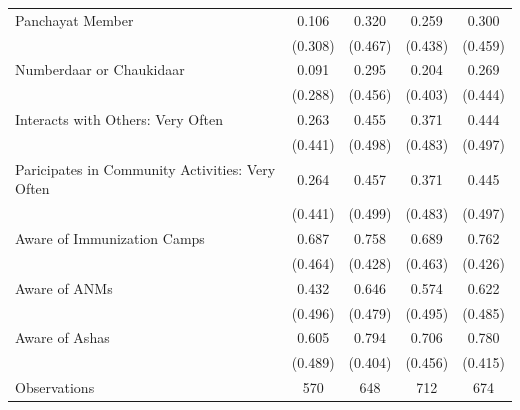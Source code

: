 \begin{tabular}{lcccc}
 Panchayat Member & 0.106 & 0.320 & 0.259  & 0.300 \\ 
  & (0.308) & (0.467) & (0.438)  & (0.459) \\ 
 Numberdaar or Chaukidaar & 0.091 & 0.295 & 0.204  & 0.269 \\ 
  & (0.288) & (0.456) & (0.403)  & (0.444) \\ 
 Interacts with Others: Very Often & 0.263 & 0.455 & 0.371  & 0.444 \\ 
  & (0.441) & (0.498) & (0.483)  & (0.497) \\ 
 Paricipates in Community Activities: Very Often & 0.264 & 0.457 & 0.371  & 0.445 \\ 
  & (0.441) & (0.499) & (0.483)  & (0.497) \\ 
 Aware of Immunization Camps & 0.687 & 0.758 & 0.689  & 0.762 \\ 
  & (0.464) & (0.428) & (0.463)  & (0.426) \\ 
 Aware of ANMs & 0.432 & 0.646 & 0.574  & 0.622 \\ 
  & (0.496) & (0.479) & (0.495)  & (0.485) \\ 
 Aware of Ashas & 0.605 & 0.794 & 0.706  & 0.780 \\ 
  & (0.489) & (0.404) & (0.456)  & (0.415) \\ 
 Observations & 570 & 648 & 712  & 674 \\ 
\end{tabular}
